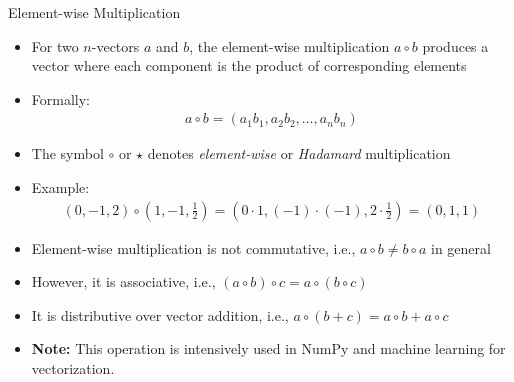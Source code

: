 
\begin{frame}{Element-wise Multiplication}
\begin{itemize}
    \item For two $n$-vectors $a$ and $b$, the element-wise multiplication $a \circ b$ produces a vector where each component is the product of corresponding elements
    \item Formally:
    \begin{align*}
        a \circ b = (a_1 b_1, a_2 b_2, \ldots, a_n b_n)
    \end{align*}
    \item The symbol $\circ$ or $\star$ denotes \textit{element-wise} or \textit{Hadamard} multiplication
\end{itemize}
\end{frame}
\begin{frame}
    \begin{itemize}
        \item Example: 
    \begin{align*}
        (0, -1, 2) \circ (1, -1, \frac{1}{2}) = (0 \cdot 1, (-1) \cdot (-1), 2 \cdot \frac{1}{2}) = (0, 1, 1)
    \end{align*}
        \item Element-wise multiplication is not commutative, i.e., $a \circ b \neq b \circ a$ in general
        \item However, it is associative, i.e., $(a \circ b) \circ c = a \circ (b \circ c)$
        \item It is distributive over vector addition, i.e., $a \circ (b + c) = a \circ b + a \circ c$
        \item \textbf{Note:} This operation is intensively used in NumPy and machine learning for vectorization.
    \end{itemize}
\end{frame}

